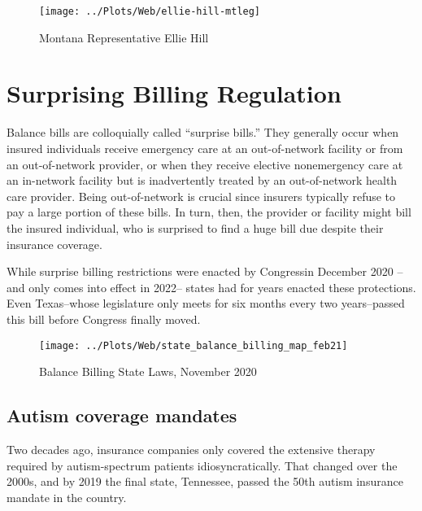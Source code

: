 \documentclass[
  oneside]{book}
\begin{document}
\begin{figure}

{\centering \texttt{[image: ../Plots/Web/ellie-hill-mtleg]} 

}

\caption{Montana Representative Ellie Hill}\label{fig:intro-elliehill}
\end{figure}

\hypertarget{surprising-billing-regulation}{%
\section{Surprising Billing Regulation}\label{surprising-billing-regulation}}

Balance bills are colloquially called ``surprise bills.'' They generally occur when insured individuals receive emergency care at an out-of-network facility or from an out-of-network provider, or when they receive elective nonemergency care at an in-network facility but is inadvertently treated by an out-of-network health care provider. Being out-of-network is crucial since insurers typically refuse to pay a large portion of these bills. In turn, then, the provider or facility might bill the insured individual, who is surprised to find a huge bill due despite their insurance coverage.

While surprise billing restrictions were enacted by Congressin December 2020 -- and only comes into effect in 2022-- states had for years enacted these protections. Even Texas--whose legislature only meets for six months every two years--passed this bill before Congress finally moved.

\begin{figure}
\texttt{[image: ../Plots/Web/state\_balance\_billing\_map\_feb21]} \caption{Balance Billing State Laws, November 2020}\label{fig:surprise-us}
\end{figure}

\hypertarget{autism-coverage-mandates}{%
\subsection{Autism coverage mandates}\label{autism-coverage-mandates}}

Two decades ago, insurance companies only covered the extensive therapy required by autism-spectrum patients idiosyncratically. That changed over the 2000s, and by 2019 the final state, Tennessee, passed the 50th autism insurance mandate in the country.
\end{document}
